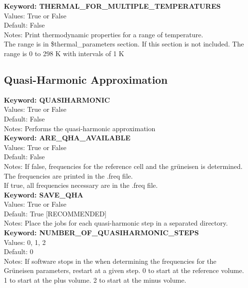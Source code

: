 \documentclass[11pt,letterpaper]{article}
\begin{document}
\begin{spacing}{1.0}
\noindent
\textbf{Keyword: THERMAL\_FOR\_MULTIPLE\_TEMPERATURES} \\
Values: True or False\\
Default: False\\
Notes: Print thermodynamic properties for a range of temperature.   \\
The range is in \$thermal\_parameters section. If this section is not included.
The range is 0 to 298 K with intervals of 1 K\\

\subsection{Quasi-Harmonic Approximation}

\noindent
\textbf{Keyword: QUASIHARMONIC} \\
Values: True or False\\
Default: False\\
Notes: Performs the quasi-harmonic approximation\\

\noindent
\textbf{Keyword: ARE\_QHA\_AVAILABLE} \\
Values: True or False\\
Default: False\\
Notes: If false, frequencies for the reference cell and the
       gr\"{u}neisen is determined. The frequencies are printed
       in the .freq file.\\
       If true, all frequencies necessary are in the .freq file.\\

\noindent
\textbf{Keyword: SAVE\_QHA} \\
Values: True or False\\
Default: True [RECOMMENDED]\\
Notes: Place the jobs for each quasi-harmonic step in a separated directory. \\

\noindent
\textbf{Keyword: NUMBER\_OF\_QUASIHARMONIC\_STEPS} \\
Values: 0, 1, 2\\
Default: 0\\
Notes: If software stops in the when determining the frequencies for the Gr\"{u}neisen parameters,
            restart at a given step. 0 to start at the reference volume. 1 to start at the plus volume.
            2 to start at the minus volume.\\ 



\end{spacing}
\end{document}
